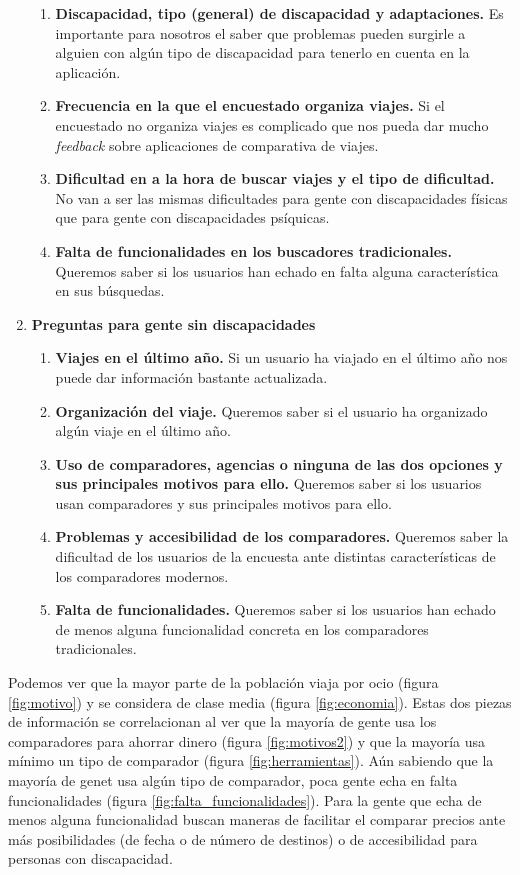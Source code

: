 \begin{enumerate}
    \begin{enumerate}
        \item\textbf{Discapacidad, tipo (general) de discapacidad y adaptaciones.} Es importante para nosotros el saber que problemas pueden surgirle a alguien con algún tipo de discapacidad para tenerlo en cuenta en la aplicación.
    \item\textbf{Frecuencia en la que el encuestado organiza viajes.} Si el encuestado no organiza viajes es complicado que nos pueda dar mucho \textit{feedback} sobre aplicaciones de comparativa de viajes.
    \item\textbf{Dificultad en a la hora de buscar viajes y el tipo de dificultad.} No van a ser las mismas dificultades para gente con discapacidades físicas que para gente con discapacidades psíquicas.
    \item\textbf{Falta de funcionalidades en los buscadores tradicionales.} Queremos saber si los usuarios han echado en falta alguna característica en sus búsquedas.
    \end{enumerate}
    \item\textbf{Preguntas para gente sin discapacidades}
    \begin{enumerate}
        \item\textbf{Viajes en el último año.} Si un usuario ha viajado en el último año nos puede dar información bastante actualizada.
        \item\textbf{Organización del viaje.} Queremos saber si el usuario ha organizado algún viaje en el último año.
        \item\textbf{Uso de comparadores, agencias o ninguna de las dos opciones y sus principales motivos para ello.} Queremos saber si los usuarios usan comparadores y sus principales motivos para ello.
        \item\textbf{Problemas y accesibilidad de los comparadores.} Queremos saber la dificultad de los usuarios de la encuesta ante distintas características de los comparadores modernos.
        \item\textbf{Falta de funcionalidades.} Queremos saber si los usuarios han echado de menos alguna funcionalidad concreta en los comparadores tradicionales.
    \end{enumerate}
    
\end{enumerate}

Podemos ver que la mayor parte de la población viaja por ocio (figura \ref{fig:motivo}) y se considera de clase media (figura \ref{fig:economia}). Estas dos piezas de información se correlacionan al ver que la mayoría de gente usa los comparadores para ahorrar dinero (figura \ref{fig:motivos2}) y que la mayoría usa mínimo un tipo de comparador (figura \ref{fig:herramientas}). Aún sabiendo que la mayoría de genet usa algún tipo de comparador, poca gente echa en falta funcionalidades (figura \ref{fig:falta_funcionalidades}). Para la gente que echa de menos alguna funcionalidad buscan maneras de facilitar el comparar precios ante más posibilidades (de fecha o de número de destinos) o de accesibilidad para personas con discapacidad.


